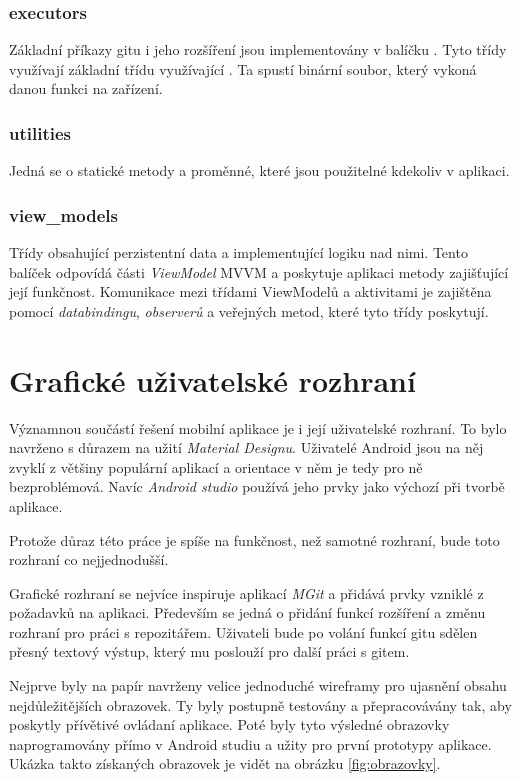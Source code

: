     \subsubsection{executors}
    Základní příkazy gitu i jeho rozšíření jsou implementovány v balíčku . Tyto třídy využívají základní třídu  využívající . Ta spustí binární soubor, který vykoná danou funkci na zařízení.

    \subsubsection{utilities}
    Jedná se o statické metody a proměnné, které jsou použitelné kdekoliv v aplikaci. 

    \subsubsection{view\_models}
    Třídy obsahující perzistentní data a implementující logiku nad nimi. Tento balíček odpovídá části \emph{ViewModel} MVVM a poskytuje aplikaci metody zajišťující její funkčnost. Komunikace mezi třídami ViewModelů a aktivitami je zajištěna pomocí \emph{databindingu}, \emph{observerů} a veřejných metod, které tyto třídy poskytují.

\newpage
\section{Grafické uživatelské rozhraní}
Významnou součástí řešení mobilní aplikace je i její uživatelské rozhraní. To bylo navrženo s důrazem na užití \emph{Material Designu}. Uživatelé Android jsou na něj zvyklí z většiny populární aplikací a orientace v něm je tedy pro ně bezproblémová. Navíc \emph{Android studio} používá jeho prvky jako výchozí při tvorbě aplikace.

Protože důraz této práce je spíše na funkčnost, než samotné rozhraní, bude toto rozhraní co nejjednodušší.

Grafické rozhraní se nejvíce inspiruje aplikací \emph{MGit} a přidává prvky vzniklé z požadavků na aplikaci. Především se jedná o přidání funkcí rozšíření a změnu rozhraní pro práci s repozitářem. Uživateli bude po volání funkcí gitu sdělen přesný textový výstup, který mu poslouží pro další práci s gitem. 

Nejprve byly na papír navrženy velice jednoduché wireframy pro ujasnění obsahu nejdůležitějších obrazovek. Ty byly postupně testovány a přepracovávány tak, aby poskytly přívětivé ovládaní aplikace. Poté byly tyto výsledné obrazovky naprogramovány přímo v Android studiu a užity pro první prototypy aplikace. Ukázka takto získaných obrazovek je vidět na obrázku \ref{fig:obrazovky}.

